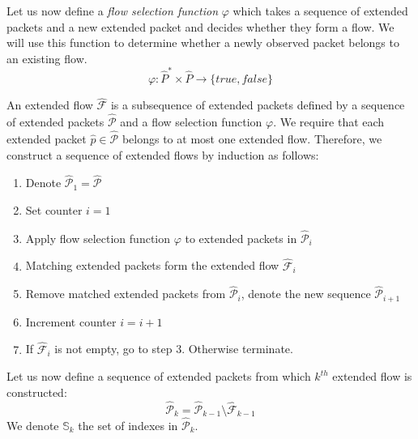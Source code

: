 Let us now define a \emph{flow selection function} $\varphi$ which takes a sequence of extended packets and a new extended packet and decides whether they form a flow. We will use this function to determine whether a newly observed packet belongs to an existing flow.
\begin{equation}
 	\varphi: \widehat{P}^*\times \widehat{P} \to \{true,false\}
\end{equation}

An extended flow $\widehat{\mathcal{F}}$ is a subsequence of extended packets defined by a sequence of extended packets $\widehat{\mathcal{P}}$ and a flow selection function $\varphi$. We require that each extended packet $\widehat{p} \in \widehat{\mathcal{P}}$ belongs to at most one extended flow. Therefore, we construct a sequence of extended flows by induction as follows:
\begin{enumerate}[noitemsep]
	\item Denote $\widehat{\mathcal{P}}_1 = \widehat{\mathcal{P}}$
	\item Set counter $i = 1$
	\item Apply flow selection function $\varphi$ to extended packets in $\widehat{\mathcal{P}}_i$
	\item Matching extended packets form the extended flow $\widehat{\mathcal{F}}_i$
	\item Remove matched extended packets from $\widehat{\mathcal{P}}_i$, denote the new sequence $\widehat{\mathcal{P}}_{i+1}$
	\item Increment counter $i = i + 1$
	\item If $\widehat{\mathcal{F}}_i$ is not empty, go to step 3. Otherwise terminate.
\end{enumerate}

Let us now define a sequence of extended packets from which $k^{th}$ extended flow is constructed:
\begin{equation*}
\widehat{\mathcal{P}}_k = \widehat{\mathcal{P}}_{k-1} \setminus \widehat{\mathcal{F}}_{k-1}
\end{equation*}
We denote $\mathbb{S}_k$ the set of indexes in $\widehat{\mathcal{P}}_k$.


